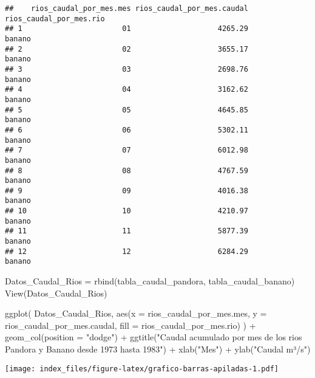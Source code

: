 \documentclass[
]{article}
\newenvironment{Shaded}{\begin{snugshade}}{\end{snugshade}}
\newcommand{\AttributeTok}[1]{\textcolor[rgb]{0.77,0.63,0.00}{#1}}
\newcommand{\FunctionTok}[1]{\textcolor[rgb]{0.00,0.00,0.00}{#1}}
\newcommand{\NormalTok}[1]{#1}
\newcommand{\OtherTok}[1]{\textcolor[rgb]{0.56,0.35,0.01}{#1}}
\newcommand{\SpecialCharTok}[1]{\textcolor[rgb]{0.00,0.00,0.00}{#1}}
\newcommand{\StringTok}[1]{\textcolor[rgb]{0.31,0.60,0.02}{#1}}
\begin{document}
\begin{verbatim}
##    rios_caudal_por_mes.mes rios_caudal_por_mes.caudal rios_caudal_por_mes.rio
## 1                       01                    4265.29                  banano
## 2                       02                    3655.17                  banano
## 3                       03                    2698.76                  banano
## 4                       04                    3162.62                  banano
## 5                       05                    4645.85                  banano
## 6                       06                    5302.11                  banano
## 7                       07                    6012.98                  banano
## 8                       08                    4767.59                  banano
## 9                       09                    4016.38                  banano
## 10                      10                    4210.97                  banano
## 11                      11                    5877.39                  banano
## 12                      12                    6284.29                  banano
\end{verbatim}

\begin{Shaded}
\begin{Highlighting}[]
\NormalTok{Datos\_Caudal\_Rios }\OtherTok{=} \FunctionTok{rbind}\NormalTok{(tabla\_caudal\_pandora, tabla\_caudal\_banano)}
\FunctionTok{View}\NormalTok{(Datos\_Caudal\_Rios)}
\end{Highlighting}
\end{Shaded}

\begin{Shaded}
\begin{Highlighting}[]
\FunctionTok{ggplot}\NormalTok{(}
\NormalTok{  Datos\_Caudal\_Rios, }
  \FunctionTok{aes}\NormalTok{(}\AttributeTok{x =}\NormalTok{ rios\_caudal\_por\_mes.mes, }\AttributeTok{y =}\NormalTok{ rios\_caudal\_por\_mes.caudal, }\AttributeTok{fill =}\NormalTok{ rios\_caudal\_por\_mes.rio)}
\NormalTok{) }\SpecialCharTok{+}
  \FunctionTok{geom\_col}\NormalTok{(}\AttributeTok{position =} \StringTok{"dodge"}\NormalTok{) }\SpecialCharTok{+}
  \FunctionTok{ggtitle}\NormalTok{(}\StringTok{"Caudal acumulado por mes de los rios Pandora y Banano desde 1973 hasta 1983"}\NormalTok{) }\SpecialCharTok{+}
  \FunctionTok{xlab}\NormalTok{(}\StringTok{"Mes"}\NormalTok{) }\SpecialCharTok{+}
  \FunctionTok{ylab}\NormalTok{(}\StringTok{"Caudal m³/s"}\NormalTok{) }
\end{Highlighting}
\end{Shaded}

\texttt{[image: index\_files/figure-latex/grafico-barras-apiladas-1.pdf]}
\end{document}
